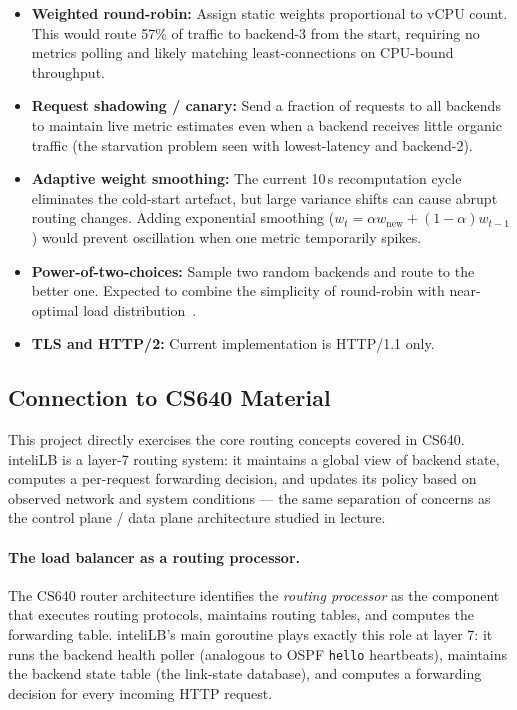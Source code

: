 \documentclass[12pt]{article}
\begin{document}
\begin{itemize}
  \item \textbf{Weighted round-robin:} Assign static weights proportional to
        vCPU count. This would route 57\% of traffic to backend-3 from the
        start, requiring no metrics polling and likely matching least-connections
        on CPU-bound throughput.
  \item \textbf{Request shadowing / canary:} Send a fraction of requests to
        all backends to maintain live metric estimates even when a backend
        receives little organic traffic (the starvation problem seen with
        lowest-latency and backend-2).
  \item \textbf{Adaptive weight smoothing:} The current 10\,s recomputation
        cycle eliminates the cold-start artefact, but large variance shifts
        can cause abrupt routing changes. Adding exponential smoothing
        ($w_t = \alpha w_{\text{new}} + (1-\alpha) w_{t-1}$) would prevent
        oscillation when one metric temporarily spikes.
  \item \textbf{Power-of-two-choices:} Sample two random backends and route to
        the better one. Expected to combine the simplicity of round-robin with
        near-optimal load distribution~\cite{power-of-two}.
  \item \textbf{TLS and HTTP/2:} Current implementation is HTTP/1.1 only.
\end{itemize}

\subsection{Connection to CS640 Material}

This project directly exercises the core routing concepts covered in CS640.
inteliLB is a layer-7 routing system: it maintains a global view of backend
state, computes a per-request forwarding decision, and updates its policy based
on observed network and system conditions — the same separation of concerns
as the control plane / data plane architecture studied in lecture.

\paragraph{The load balancer as a routing processor.}
The CS640 router architecture identifies the \textit{routing processor} as the
component that executes routing protocols, maintains routing tables, and computes
the forwarding table. inteliLB's main goroutine plays exactly this role at layer 7:
it runs the backend health poller (analogous to OSPF \texttt{hello} heartbeats),
maintains the backend state table (the link-state database), and computes a
forwarding decision for every incoming HTTP request.
\end{document}
